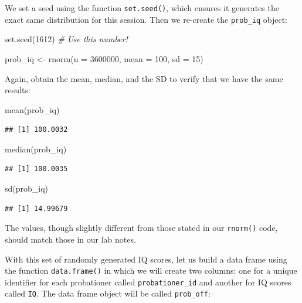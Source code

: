 \documentclass[
]{book}
\newenvironment{Shaded}{\begin{snugshade}}{\end{snugshade}}
\newcommand{\AttributeTok}[1]{\textcolor[rgb]{0.77,0.63,0.00}{#1}}
\newcommand{\CommentTok}[1]{\textcolor[rgb]{0.56,0.35,0.01}{\textit{#1}}}
\newcommand{\DecValTok}[1]{\textcolor[rgb]{0.00,0.00,0.81}{#1}}
\newcommand{\FunctionTok}[1]{\textcolor[rgb]{0.00,0.00,0.00}{#1}}
\newcommand{\NormalTok}[1]{#1}
\newcommand{\OtherTok}[1]{\textcolor[rgb]{0.56,0.35,0.01}{#1}}
\begin{document}
We set a seed using the function \texttt{set.seed()}, which ensures it generates the exact same distribution for this session. Then we re-create the \texttt{prob\_iq} object:

\begin{Shaded}
\begin{Highlighting}[]
\FunctionTok{set.seed}\NormalTok{(}\DecValTok{1612}\NormalTok{) }\CommentTok{\# Use this number! }

\NormalTok{prob\_iq }\OtherTok{\textless{}{-}} \FunctionTok{rnorm}\NormalTok{(}\AttributeTok{n =} \DecValTok{3600000}\NormalTok{, }\AttributeTok{mean =} \DecValTok{100}\NormalTok{, }\AttributeTok{sd =} \DecValTok{15}\NormalTok{)}
\end{Highlighting}
\end{Shaded}

Again, obtain the mean, median, and the SD to verify that we have the same results:

\begin{Shaded}
\begin{Highlighting}[]
\FunctionTok{mean}\NormalTok{(prob\_iq) }
\end{Highlighting}
\end{Shaded}

\begin{verbatim}
## [1] 100.0032
\end{verbatim}

\begin{Shaded}
\begin{Highlighting}[]
\FunctionTok{median}\NormalTok{(prob\_iq) }
\end{Highlighting}
\end{Shaded}

\begin{verbatim}
## [1] 100.0035
\end{verbatim}

\begin{Shaded}
\begin{Highlighting}[]
\FunctionTok{sd}\NormalTok{(prob\_iq) }
\end{Highlighting}
\end{Shaded}

\begin{verbatim}
## [1] 14.99679
\end{verbatim}

The values, though slightly different from those stated in our \texttt{rnorm()} code, should match those in our lab notes.

With this set of randomly generated IQ scores, let us build a data frame using the function \texttt{data.frame()} in which we will create two columns: one for a unique identifier for each probationer called \texttt{probationer\_id} and another for IQ scores called \texttt{IQ}. The data frame object will be called \texttt{prob\_off}:
\end{document}
